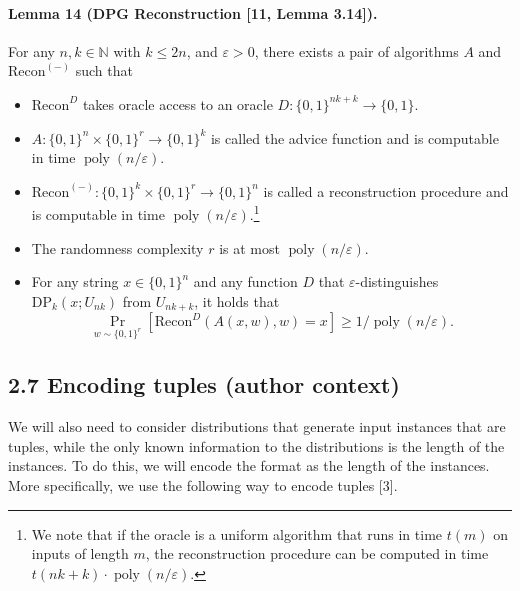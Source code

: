 \paragraph{Lemma 14 (DPG Reconstruction [11, Lemma 3.14]).} For any $n,k\in\mathbb N$ with $k\leq2n$, and $\varepsilon>0$, there exists a pair of algorithms $A$ and $\mathrm{Recon}^{(-)}$ such that
\begin{itemize}
\item $\mathrm{Recon}^D$ takes oracle access to an oracle $D:\{0,1\}^{nk+k}\to\{0,1\}$.
\item $A:\{0,1\}^n\times\{0,1\}^r\to\{0,1\}^k$ is called the advice function and is computable in time $\operatorname{poly}(n/\varepsilon)$.
\item $\mathrm{Recon}^{(-)}:\{0,1\}^k\times\{0,1\}^r\to\{0,1\}^n$ is called a reconstruction procedure and is computable in time $\operatorname{poly}(n/\varepsilon)$.\footnote{We note that if the oracle is a uniform algorithm that runs in time $t(m)$ on inputs of length $m$, the reconstruction procedure can be computed in time $t(nk+k)\cdot\operatorname{poly}(n/\varepsilon)$.}
\item The randomness complexity $r$ is at most $\operatorname{poly}(n/\varepsilon)$.
\item For any string $x\in\{0,1\}^n$ and any function $D$ that $\varepsilon$-distinguishes $\mathrm{DP}_k(x;U_{nk})$ from $U_{nk+k}$, it holds that
\[\Pr_{w\sim\{0,1\}^r}[\mathrm{Recon}^D(A(x,w),w)=x]\geq1/\operatorname{poly}(n/\varepsilon).\]
\end{itemize}
\subsection*{2.7 Encoding tuples (author context)}
We will also need to consider distributions that generate input instances that are tuples, while the only known information to the distributions is the length of the instances. To do this, we will encode the format as the length of the instances. More specifically, we use the following way to encode tuples [3].
